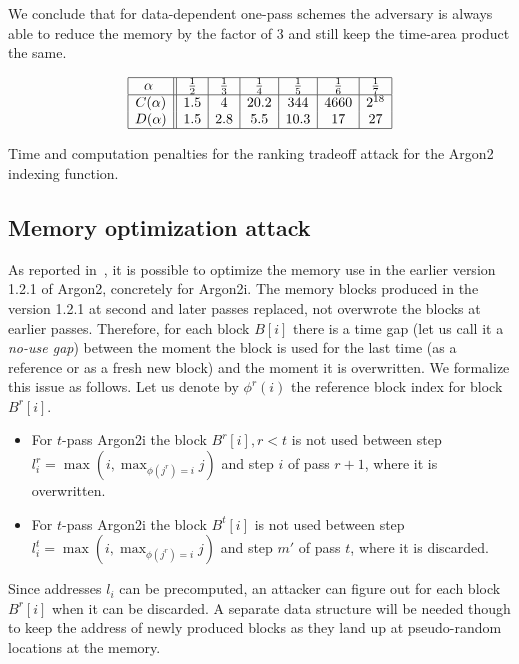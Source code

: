 \documentclass[a4paper]{article}
\begin{document}
We conclude that for data-dependent one-pass schemes the adversary is always able to reduce the memory by the factor of 3 and still keep the time-area product the same.
\begin{table}[hb]
\renewcommand{\arraystretch}{1.3}
$$
\begin{array}{|c||c|c|c|c|c|c|c|c|}
\hline
\text{$\alpha$ } &\frac{1}{2} &\frac{1}{3} &\frac{1}{4} &\frac{1}{5} &\frac{1}{6} &\frac{1}{7}  \\
\hline
\text{$C(\alpha)$} &1.5& 4& 20.2& 344&  4660 &  2^{18}\\
\text{$D(\alpha)$} & 1.5 & 2.8 & 5.5 & 10.3 & 17 &27 \\
\hline
\end{array}
$$
\caption{Time and computation penalties for the ranking tradeoff attack for the Argon2 indexing function.}\label{tab:generic3}
\end{table}

\subsection{Memory optimization attack}

As reported in~\cite{Corrigan-GibbsB16}, it is possible to optimize the memory use in the earlier version 1.2.1 of Argon2, concretely for Argon2i. The memory blocks produced in the version 1.2.1  at second and later passes replaced, not overwrote the blocks at earlier passes. Therefore, for each block $B[i]$ there is a time gap (let us call it a \emph{no-use gap}) between the moment the block is used for the last time (as a reference or as a fresh new block) and the moment it is overwritten. We formalize this issue as follows. Let us denote by $\phi^r(i)$ the reference block index for block $B^r[i]$. 
\begin{itemize}
    \item For $t$-pass Argon2i the block $B^r[i], r<t$ is not used between step
    $l_i^r = \max\left(i,\max_{\phi(j^r) = i} j\right)$ and step $i$ of pass $r+1$, where it is overwritten.
    \item For $t$-pass Argon2i the block $B^t[i]$ is not used between step
    $l_i^t = \max\left(i,\max_{\phi(j^r) = i} j\right)$ and step $m'$ of pass $t$, where it is discarded.
\end{itemize}



Since 
addresses $l_i$ can be precomputed, an attacker can figure out for each block $B^r[i]$ when it can be discarded. 
A separate data structure will be needed though to keep the address of newly produced blocks as they land up at pseudo-random locations at the memory. 
\end{document}
